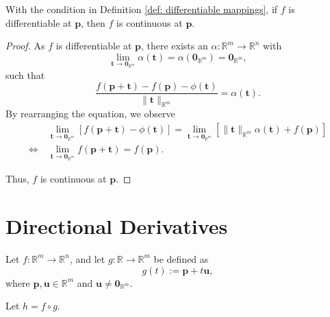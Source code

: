 \begin{lemma}
	\label{lm: differentiable mappings: implies continuity}
	With the condition in Definition \ref{def: differentiable mappings}, if $f$ is differentiable at $\mathbf p$, then $f$ is continuous at $\mathbf p$.
	
	\begin{proof}
		As $f$ is differentiable at $\mathbf p$, there exists an $\alpha: \mathbb R^m \to \mathbb R^n$ with
		$$
		\lim_{\mathbf t \to \mathbf 0_{\mathbb R^m}} \alpha(\mathbf t) = \alpha(\mathbf 0_{\mathbb R^m}) = \mathbf 0_{\mathbb R^m},
		$$
		such that
		$$
		\frac{f(\mathbf p + \mathbf t) - f(\mathbf p) - \phi(\mathbf t)}{\| \mathbf t \|_{\mathbb R^m}} = \alpha(\mathbf t).
		$$
		By rearranging the equation, we observe
		$$
		\begin{aligned}
		& \ \lim_{\mathbf t \to \mathbf 0_{\mathbb R^m}}[f(\mathbf p + \mathbf t) - \phi(\mathbf t)] = \lim_{\mathbf t \to \mathbf 0_{\mathbb R^m}} [\| \mathbf t \|_{\mathbb R^m}\alpha(\mathbf t) + f(\mathbf p)] \\
		\iff & \ \lim_{\mathbf t \to \mathbf 0_{\mathbb R^m}} f(\mathbf p + \mathbf t) = f(\mathbf p).
		\end{aligned}
		$$
		
		Thus, $f$ is continuous at $\mathbf p$.
	\end{proof}
\end{lemma}




\section{Directional Derivatives}


\begin{observation}
	Let $f: \mathbb R^m \to \mathbb R^n$, and let $g:\mathbb R \to \mathbb R^m$ be defined as
	$$
	g(t) := \mathbf p + t \mathbf u,
	$$
	where $\mathbf p , \mathbf u \in \mathbb R^m$ and $\mathbf u \ne \mathbf 0_{\mathbb R^m}$.
	
	Let $h = f \circ g$.
\end{observation}















































%
